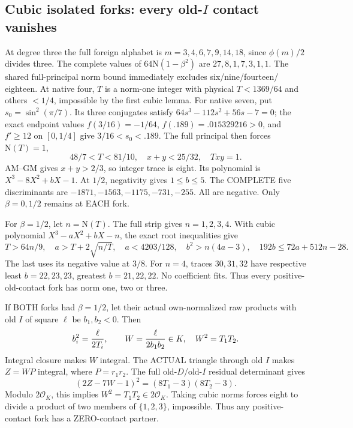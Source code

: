\documentclass[11pt]{article}
\begin{document}
\subsection{Cubic isolated forks: every old-\(I\) contact vanishes}
\label{app:arithD16Icubiccontacts}

At degree three the full foreign
alphabet is \(m=3,4,6,7,9,14,18\),
since \(\phi(m)/2\) divides three.
The complete values of
\(64\mathrm N(1-\beta^2)\) are
\(27,8,1,7,3,1,1\).
The shared full-principal norm bound
immediately excludes six/nine/fourteen/
eighteen.
At native four, \(T\) is a norm-one
integer with physical \(T<1369/64\)
and others \(<1/4\), impossible by
the first cubic lemma.
For native seven, put
\(s_0=\sin^2(\pi/7)\).
Its three conjugates satisfy
\(64s^3-112s^2+56s-7=0\);
the exact endpoint values
\(f(3/16)=-1/64\),
\(f(.189)=.015329216>0\),
and \(f'\ge12\) on \([0,1/4]\)
give \(3/16<s_0<.189\).
The full principal then forces
\(\mathrm N(T)=1\),
\[
                48/7<T<81/10,\quad
                x+y<25/32,\quad Txy=1 .
\]
AM--GM gives \(x+y>2/3\), so
integer trace is eight.
Its polynomial is \(X^3-8X^2+bX-1\).
At \(1/2\), negativity gives \(1\le b\le5\).
The COMPLETE five discriminants are
\(-1871,-1563,-1175,-731,-255\).
All are negative.
Only \(\beta=0,1/2\) remains at EACH fork.

For \(\beta=1/2\), let \(n=\mathrm N(T)\).
The full strip gives \(n=1,2,3,4\).
With cubic polynomial \(X^3-aX^2+bX-n\),
the exact root inequalities give
\[
 T>64n/9,\quad a>T+2\sqrt{n/T},\quad
 a<4203/128,\quad b^2>n(4a-3),\quad
                         192b\le72a+512n-28 .
\]
The last uses its negative value at
\(3/8\).
For \(n=4\), traces \(30,31,32\)
have respective least \(b=22,23,23\),
greatest \(b=21,22,22\).
No coefficient fits.
Thus every positive-old-contact fork
has norm one, two or three.

If BOTH forks had \(\beta=1/2\),
let their actual own-normalized raw
products with old \(I\) of square
\(\ell\) be \(b_1,b_2<0\).
Then
\[
 b_i^2={\ell\over2T_i},\qquad
 W={\ell\over2b_1b_2}\in K,\quad W^2=T_1T_2 .
\]
Integral closure makes \(W\) integral.
The ACTUAL triangle through old \(I\)
makes \(Z=WP\) integral, where
\(P=r_1r_2\).
The full old-\(D\)/old-\(I\) residual
determinant gives
\[
                         (2Z-7W-1)^2=(8T_1-3)(8T_2-3).
\]
Modulo \(2\mathcal O_K\), this implies
\(W^2=T_1T_2\in2\mathcal O_K\).
Taking cubic norms forces eight to
divide a product of two members of
\(\{1,2,3\}\), impossible.
Thus any positive-contact fork has
a ZERO-contact partner.
\end{document}
